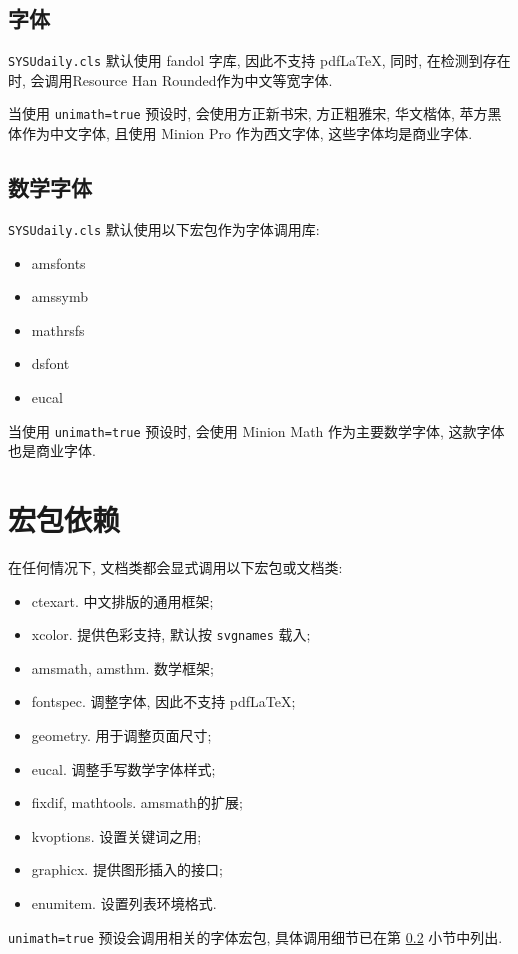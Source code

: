 \documentclass{SYSUDaily}
\begin{document}
\subsection{字体}
\verb|SYSUdaily.cls| 默认使用 \textsf{fandol} 字库, 因此不支持 pdf\LaTeX{}, 同时,
在检测到存在时, 会调用Resource Han Rounded作为中文等宽字体.

当使用 \verb|unimath=true| 预设时, 会使用方正新书宋, 方正粗雅宋, 华文楷体, 苹方黑体作为中文字体, 且使用 Minion Pro 作为西文字体, 这些字体均是商业字体.

\subsection{数学字体}
\label{ssec:math_fonts}
\verb|SYSUdaily.cls| 默认使用以下宏包作为字体调用库:
\begin{itemize}[parsep=0pt,itemsep=0pt]
	\item
			\textsf{amsfonts}
	\item
			\textsf{amssymb}
	\item
			\textsf{mathrsfs}
	\item
			\textsf{dsfont}
	\item
			\textsf{eucal}
\end{itemize}
当使用 \verb|unimath=true| 预设时, 会使用 Minion Math 作为主要数学字体, 这款字体也是商业字体.

\section{宏包依赖}

在任何情况下, 文档类都会显式调用以下宏包或文档类:
\begin{itemize}[parsep=0pt,itemsep=0pt]
	\item
			\textsf{ctexart}. 中文排版的通用框架;
	\item
			\textsf{xcolor}. 提供色彩支持, 默认按 \verb|svgnames| 载入;
	\item
			\textsf{amsmath}, \textsf{amsthm}. 数学框架;
	\item
			\textsf{fontspec}. 调整字体, 因此不支持 pdf\LaTeX{};
	\item
			\textsf{geometry}. 用于调整页面尺寸;
	\item
			\textsf{eucal}. 调整手写数学字体样式;
	\item
			\textsf{fixdif}, \textsf{mathtools}. \textsf{amsmath}的扩展;
	\item
			\textsf{kvoptions}. 设置关键词之用;
	\item
			\textsf{graphicx}. 提供图形插入的接口;
	\item
			\textsf{enumitem}. 设置列表环境格式.
\end{itemize}
\verb|unimath=true| 预设会调用相关的字体宏包, 具体调用细节已在第 \ref{ssec:math_fonts} 小节中列出.
\end{document}
